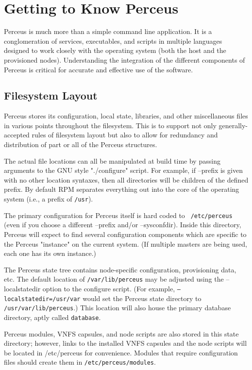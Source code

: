\documentclass[10pt,letterpaper]{report}
\begin{document}
\section{Getting to Know Perceus}

Perceus is much more than a simple command line application.  It is a
conglomeration of services, executables, and scripts in multiple languages
designed to work closely with the operating system (both the host and the
provisioned nodes).  Understanding the integration of the different components
of Perceus is critical for accurate and effective use of the software.

\subsection{Filesystem Layout}

Perceus stores its configuration, local state, libraries, and other
miscellaneous files in various points throughout the filesystem. This is to
support not only generally-accepted rules of filesystem layout but also to
allow for redundancy and distribution of part or all of the Perceus
structures.

The actual file locations can all be manipulated at build time by
passing arguments to the GNU style "./configure" script. For example, if
--prefix is given with no other location syntaxes, then all directories will
be children of the defined prefix. By default RPM separates everything out
into the core of the operating system (i.e., a prefix of {\tt /usr}).

The primary configuration for Perceus itself is hard coded to {\tt
/etc/perceus} (even if you choose a different --prefix and/or --sysconfdir).
Inside this directory, Perceus will expect to find several configuration
components which are specific to the Perceus "instance" on the current system.
(If multiple masters are being used, each one has its own instance.)

The Perceus state tree contains node-specific configuration, provisioning
data, etc.  The default location of {\tt /var/lib/perceus} may be adjusted
using the --localstatedir option to the configure script.  (For example,
{\tt --localstatedir=/usr/var} would set the Perceus state directory to
{\tt /usr/var/lib/perceus}.)  This location will also house the primary
database directory, aptly called {\tt database}.

Perceus modules, VNFS capsules, and node scripts are also stored in this state
directory; however, links to the installed VNFS capsules and the node scripts
will be located in /etc/perceus for convenience.  Modules that require
configuration files should create them in {\tt /etc/perceus/modules}.
\end{document}
